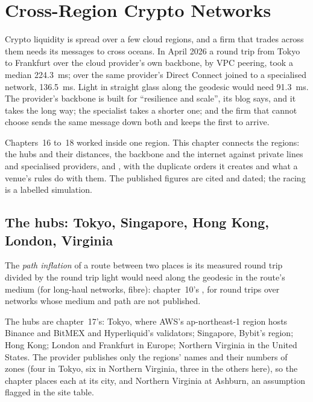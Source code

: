 \chapter{Cross-Region Crypto Networks}\label{ch:nw:cross-region-crypto-networks}

Crypto liquidity is spread over a few cloud regions, and a firm that trades across them needs its messages to cross oceans. In April 2026
a round trip from Tokyo to Frankfurt over the cloud provider's own backbone, by VPC peering, took a median \qty{224.3}{\milli\second};
over the same provider's Direct Connect joined to a specialised network, \qty{136.5}{\milli\second}. Light in straight glass along the
geodesic would need \qty{91.3}{\milli\second}. The provider's backbone is built for ``resilience and scale'', its blog says, and it takes the
long way; the specialist takes a shorter one; and the firm that cannot choose sends the same message down both and keeps the first to arrive.

Chapters~16 to~18 worked inside one region. This chapter connects the regions: the hubs and their distances, the backbone and the internet
against private lines and specialised providers, and , with the duplicate orders it creates and what a venue's rules do with
them. The published figures are cited and dated; the racing is a labelled simulation.

\section{The hubs: Tokyo, Singapore, Hong Kong, London, Virginia}

\begin{definition}\label{def:nw:cross-region-crypto-networks:infl}
The \emph{path inflation} of a route between two places is its measured round trip divided by the round trip light would
need along the geodesic in the route's medium (for long-haul networks, fibre): chapter~10's , for round trips over networks whose
medium and path are not published.
\end{definition}

The hubs are chapter~17's: Tokyo, where AWS's ap-northeast-1 region hosts Binance and BitMEX and Hyperliquid's validators; Singapore, Bybit's
region; Hong Kong; London and Frankfurt in Europe; Northern Virginia in the United States. The provider publishes only the regions' names and
their numbers of zones (four in Tokyo, six in Northern Virginia, three in the others here), so the chapter places each at its city, and
Northern Virginia at Ashburn, an assumption flagged in the site table.

